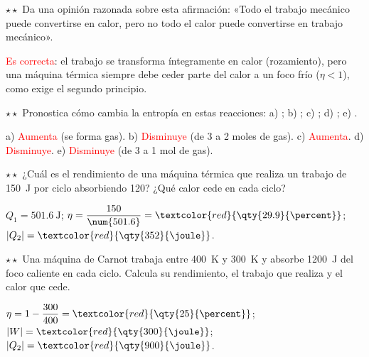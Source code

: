 \begin{exercise}
    \(\star\star\) Da una opinión razonada sobre esta afirmación: «Todo el trabajo mecánico puede convertirse en calor, pero no todo
    el calor puede convertirse en trabajo mecánico».
    \begin{solu}
        \textcolor{red}{Es correcta}: el trabajo se transforma íntegramente en calor (rozamiento), pero una máquina térmica siempre
        debe ceder parte del calor a un foco frío (\(\eta < 1\)), como exige el segundo principio.
    \end{solu}
\end{exercise}

\begin{exercise}
    \(\star\star\) Pronostica cómo cambia la entropía en estas reacciones: a) ; b)
    ; c) ; d) ; e) .
    \begin{solu}
        a) \textcolor{red}{Aumenta} (se forma gas). b) \textcolor{red}{Disminuye} (de 3 a 2 moles de gas). c) \textcolor{red}{Aumenta}.
        d) \textcolor{red}{Disminuye}. e) \textcolor{red}{Disminuye} (de 3 a 1 mol de gas).
    \end{solu}
\end{exercise}

\begin{exercise}
    \(\star\star\) ¿Cuál es el rendimiento de una máquina térmica que realiza un trabajo de \qty{150}{\joule} por ciclo absorbiendo
    \qty{120}{\calorie}? ¿Qué calor cede en cada ciclo?
    \begin{solu}
        \(Q_1 = \qty{501.6}{\joule}\); \(\eta = \dfrac{150}{\num{501.6}} = \textcolor{red}{\qty{29.9}{\percent}}\);
        \(|Q_2| = \textcolor{red}{\qty{352}{\joule}}\).
    \end{solu}
\end{exercise}

\begin{exercise}
    \(\star\star\) Una máquina de Carnot trabaja entre \qty{400}{\kelvin} y \qty{300}{\kelvin} y absorbe \qty{1200}{\joule} del foco
    caliente en cada ciclo. Calcula su rendimiento, el trabajo que realiza y el calor que cede.
    \begin{solu}
        \(\eta = 1 - \dfrac{300}{400} = \textcolor{red}{\qty{25}{\percent}}\); \(|W| = \textcolor{red}{\qty{300}{\joule}}\);
        \(|Q_2| = \textcolor{red}{\qty{900}{\joule}}\).
    \end{solu}
\end{exercise}

